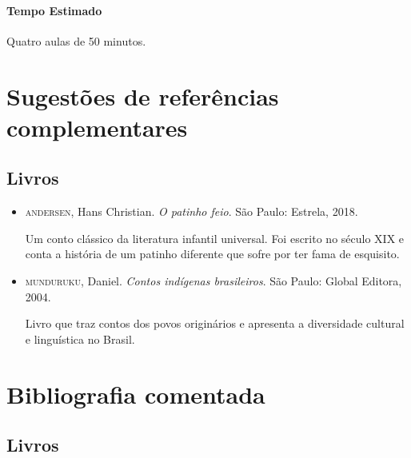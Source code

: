 \documentclass[11pt]{extarticle}
\begin{document}
\paragraph{Tempo Estimado} Quatro aulas de 50 minutos.


\section{Sugestões de referências complementares}

\subsection{Livros} 

\begin{itemize}
\item \textsc{andersen}, Hans Christian. \textit{O patinho feio}. São Paulo: Estrela, 2018.

Um conto clássico da literatura infantil universal. Foi escrito no século XIX e conta a história de um patinho diferente que sofre por ter fama de esquisito. 

\item \textsc{munduruku}, Daniel. \textit{Contos indígenas brasileiros}. São Paulo: Global Editora, 2004.

Livro que traz contos dos povos originários e apresenta a diversidade cultural e linguística no Brasil.
\end{itemize}

\section{Bibliografia comentada}
\subsection{Livros}
\end{document}
